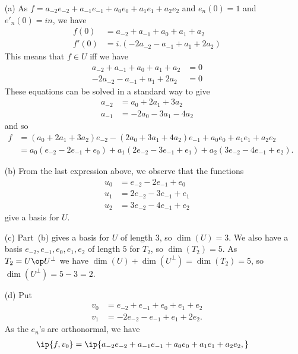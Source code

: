 \begin{solution}
 \begin{itemize}
  \item[(a)] As $f=a_{-2}e_{-2}+a_{-1}e_{-1}+a_0e_0+a_1e_1+a_2e_2$ and
   $e_n(0)=1$ and $e'_n(0)=in$, we have 
   \begin{align*}
    f(0)  &= a_{-2} + a_{-1} + a_0 + a_1 + a_2 \\
    f'(0) &= i.(-2a_{-2} - a_{-1} + a_1 + 2a_2)
   \end{align*}
   This means that $f\in U$ iff we have
   \begin{align*}
    a_{-2} + a_{-1} + a_0 + a_1 + a_2  &= 0 \\
    -2a_{-2} - a_{-1} + a_1 + 2a_2 &= 0
   \end{align*}
   These equations can be solved in a standard way to give
   \begin{align*}
    a_{-2} &= a_0 + 2a_1 + 3 a_2 \\
    a_{-1} &= - 2a_0 - 3a_1 - 4a_2
   \end{align*}
   and so
   \begin{align*}
    f &= (a_0+2a_1+3a_2) e_{-2} - (2a_0+3a_1+4a_2) e_{-1} +
          a_0e_0 + a_1e_1 + a_2e_2 \\
      &= a_0(e_{-2}-2e_{-1}+e_0) + a_1(2e_{-2}-3e_{-1}+e_1) +
         a_2(3e_{-2}-4e_{-1}+e_2).
   \end{align*}
  \item[(b)] From the last expression above, we observe that the
   functions 
   \begin{align*}
    u_0 &= e_{-2}-2e_{-1}+e_0 \\
    u_1 &= 2e_{-2}-3e_{-1}+e_1 \\
    u_2 &= 3e_{-2}-4e_{-1}+e_2
   \end{align*}
   give a basis for $U$.
  \item[(c)] Part~(b) gives a basis for $U$ of length $3$, so
   $\dim(U)=3$.  We also have a basis $e_{-2},e_{-1},e_0,e_1,e_2$ of
   length $5$ for $T_2$, so $\dim(T_2)=5$.  As $T_2=U\op U^\perp$ we have
   $\dim(U)+\dim(U^\perp)=\dim(T_2)=5$, so $\dim(U^\perp)=5-3=2$.
  \item[(d)] Put 
   \begin{align*}
    v_0 &= e_{-2} + e_{-1} + e_0 + e_1 + e_2 \\
    v_1 &= -2e_{-2} -e_{-1} + e_1 + 2e_2.
   \end{align*}
   As the $e_n$'s are orthonormal, we have
   \begin{align*}
    \ip{f,v_0} &= \ip{a_{-2}e_{-2}+a_{-1}e_{-1}+a_0e_0+a_1e_1+a_2e_2,
}
\end{align*}
\end{itemize}
\end{solution}
